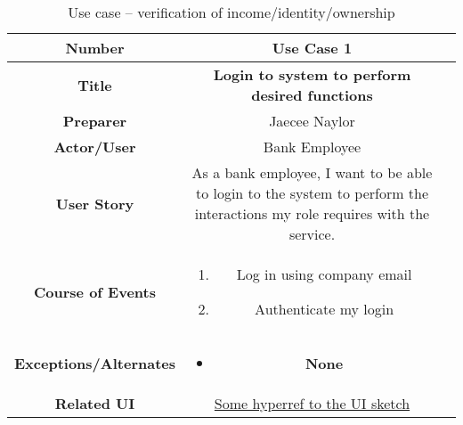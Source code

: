 \begin{table}[H]
    \centering
    \begin{tabularx}{0.75\linewidth}{||Sc|X||}
        \hline
        \hline
        \textbf{Number} & \textbf{Use Case 1} \\
        \hline
        \textbf{Title} & \textbf{Login to system to perform desired functions} \\
        \hline
        \textbf{Preparer} & Jaecee Naylor \\
        \hline
        \textbf{Actor/User} & Bank Employee \\
        \hline
        \textbf{User Story} &
        As a bank employee, I want to be able to login to the system to perform the interactions my role requires with the service. \\
        \hline
        \textbf{Course of Events} &
        \begin{minipage}[l]{\linewidth}
            \begin{enumerate}[wide, labelindent=0pt]
                \item Log in using company email
                \item Authenticate my login
            \end{enumerate}
            \vspace{4pt}
        \end{minipage} \\
        \hline
        \textbf{Exceptions/Alternates} & 
        \begin{minipage}[l]{\linewidth}
            \vspace{2pt}
            \begin{itemize}[wide, labelindent=0pt]
                \item \textbf{None}
            \end{itemize}
        \end{minipage} \\
        \hline
        \textbf{Related UI} & \hyperref[templatesec]{Some hyperref to the UI sketch} \\
        \hline
        \hline
    \end{tabularx}
    \caption{Use case -- verification of income/identity/ownership}
    \label{tab:use_case_fully_processed}
\end{table}

